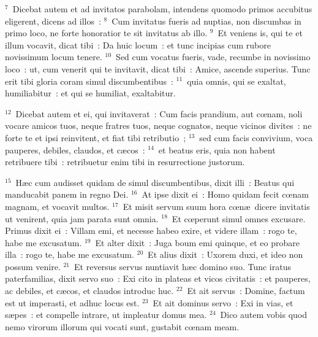 ${}^{7}$~Dicebat autem et ad invitatos parabolam, intendens quomodo primos accubitus eligerent, dicens ad illos~:
${}^{8}$~Cum invitatus fueris ad nuptias, non discumbas in primo loco, ne forte honoratior te sit invitatus ab illo.
${}^{9}$~Et veniens is, qui te et illum vocavit, dicat tibi~: Da huic locum~: et tunc incipias cum rubore novissimum locum tenere.
${}^{10}$~Sed cum vocatus fueris, vade, recumbe in novissimo loco~: ut, cum venerit qui te invitavit, dicat tibi~: Amice, ascende superius. Tunc erit tibi gloria coram simul discumbentibus~:
${}^{11}$~quia omnis, qui se exaltat, humiliabitur~: et qui se humiliat, exaltabitur.


${}^{12}$~Dicebat autem et ei, qui invitaverat~: Cum facis prandium, aut cœnam, noli vocare amicos tuos, neque fratres tuos, neque cognatos, neque vicinos divites~: ne forte te et ipsi reinvitent, et fiat tibi retributio~;
${}^{13}$~sed cum facis convivium, voca pauperes, debiles, claudos, et c\ae cos~:
${}^{14}$~et beatus eris, quia non habent retribuere tibi~: retribuetur enim tibi in resurrectione justorum.


${}^{15}$~H\ae c cum audisset quidam de simul discumbentibus, dixit illi~: Beatus qui manducabit panem in regno Dei.
${}^{16}$~At ipse dixit ei~: Homo quidam fecit cœnam magnam, et vocavit multos.
${}^{17}$~Et misit servum suum hora cœn\ae\ dicere invitatis ut venirent, quia jam parata sunt omnia.
${}^{18}$~Et cœperunt simul omnes excusare. Primus dixit ei~: Villam emi, et necesse habeo exire, et videre illam~: rogo te, habe me excusatum.
${}^{19}$~Et alter dixit~: Juga boum emi quinque, et eo probare illa~: rogo te, habe me excusatum.
${}^{20}$~Et alius dixit~: Uxorem duxi, et ideo non possum venire.
${}^{21}$~Et reversus servus nuntiavit h\ae c domino suo. Tunc iratus paterfamilias, dixit servo suo~: Exi cito in plateas et vicos civitatis~: et pauperes, ac debiles, et c\ae cos, et claudos introduc huc.
${}^{22}$~Et ait servus~: Domine, factum est ut imperasti, et adhuc locus est.
${}^{23}$~Et ait dominus servo~: Exi in vias, et s\ae pes~: et compelle intrare, ut impleatur domus mea.
${}^{24}$~Dico autem vobis quod nemo virorum illorum qui vocati sunt, gustabit cœnam meam.


